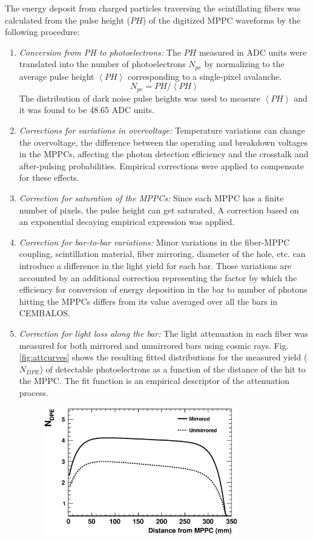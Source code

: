 The energy deposit from charged particles traversing the scintillating fibers was calculated from the pulse height ($PH$) of the digitized MPPC waveforms by the following procedure:

\begin{enumerate}
\item {\it Conversion from PH to photoelectrons:} The $PH$ measured in ADC units were translated into the number of photoelectrons $N_{pe}$ by normalizing to the average pulse height $\left\langle PH \right\rangle$ corresponding to a single-pixel avalanche. 
\begin{equation}
N_{pe} = PH/\left\langle PH \right\rangle
\end{equation}
The distribution of dark noise pulse heights was used to measure $\left\langle PH \right\rangle$ and it was found to be 48.65 ADC units. 
\item{\it Corrections for variations in overvoltage:} Temperature variations can change the overvoltage, the difference between the operating and breakdown voltages in the MPPCs, affecting the photon detection efficiency and the crosstalk and after-pulsing probabilities. Empirical corrections were applied to compensate for these effects.
\item{\it Correction for saturation of the MPPCs:} Since each MPPC has a finite number of pixels, the pulse height can get saturated. A correction based on an exponential decaying empirical expression was applied.
\item{\it Correction for bar-to-bar variations:} Minor variations in the fiber-MPPC coupling, scintillation material, fiber mirroring, diameter of the hole, etc. can introduce a difference in the light yield for each bar. Those variations are accounted by an additional correction representing the factor by which the efficiency for conversion of energy deposition in the bar to number of photons hitting the MPPCs differs from its value averaged over all the bars in CEMBALOS.
\item{\it Correction for light loss along the bar: } The light attenuation in each fiber was measured for both mirrored and unmirrored bars using cosmic rays. Fig. \ref{fig:attcurves} shows the resulting fitted distributions for the measured yield ($N_{DPE}$) of detectable photoelectrons as a function of the distance of the hit to the MPPC. The fit function is an empirical descriptor of the attenuation process.
\begin{figure}[!h]
\begin{center}
\includegraphics[width=85mm]{figures/attcurves_paper.eps}

\end{center}
\end{figure}
\end{enumerate}
